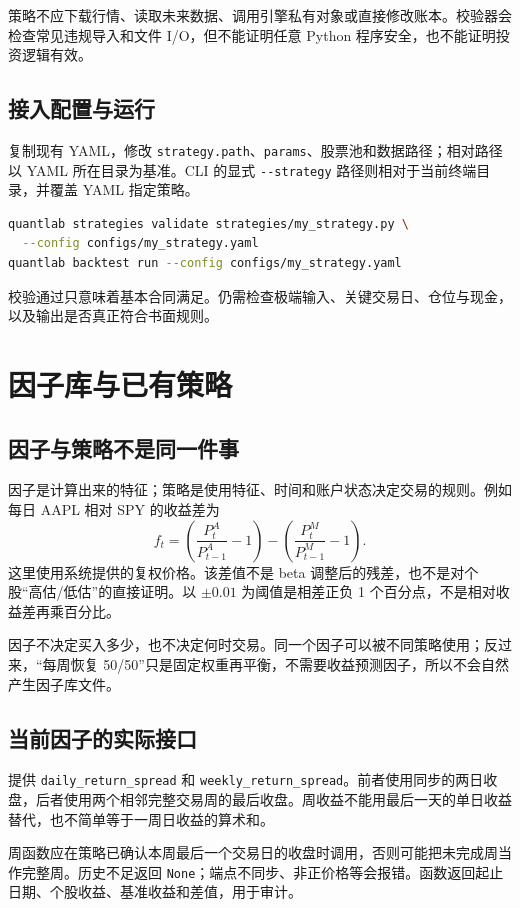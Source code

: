 \documentclass[UTF8,fontset=none,11pt]{ctexart}
\newcommand{\code}[1]{\nolinkurl{#1}}
\let\originalsection\section
\renewcommand{\section}{\Needspace{9\baselineskip}\originalsection}
\let\originalsubsection\subsection
\renewcommand{\subsection}{\Needspace{8\baselineskip}\originalsubsection}
\begin{document}
策略不应下载行情、读取未来数据、调用引擎私有对象或直接修改账本。校验器会检查常见违规导入和文件 I/O，但不能证明任意 Python 程序安全，也不能证明投资逻辑有效。

\subsection{接入配置与运行}
复制现有 YAML，修改 \code{strategy.path}、\code{params}、股票池和数据路径；相对路径以 YAML 所在目录为基准。CLI 的显式 \code{--strategy} 路径则相对于当前终端目录，并覆盖 YAML 指定策略。
\begin{lstlisting}[language=bash]
quantlab strategies validate strategies/my_strategy.py \
  --config configs/my_strategy.yaml
quantlab backtest run --config configs/my_strategy.yaml
\end{lstlisting}
校验通过只意味着基本合同满足。仍需检查极端输入、关键交易日、仓位与现金，以及输出是否真正符合书面规则。

\section{因子库与已有策略}
\subsection{因子与策略不是同一件事}
因子是计算出来的特征；策略是使用特征、时间和账户状态决定交易的规则。例如每日 AAPL 相对 SPY 的收益差为
\[
 f_t=\left(\frac{P^{A}_{t}}{P^{A}_{t-1}}-1\right)
     -\left(\frac{P^{M}_{t}}{P^{M}_{t-1}}-1\right).
\]
这里使用系统提供的复权价格。该差值不是 beta 调整后的残差，也不是对个股“高估/低估”的直接证明。以 \(\pm0.01\) 为阈值是相差正负 1 个百分点，不是相对收益差再乘百分比。

因子不决定买入多少，也不决定何时交易。同一个因子可以被不同策略使用；反过来，“每周恢复 50/50”只是固定权重再平衡，不需要收益预测因子，所以不会自然产生因子库文件。

\subsection{当前因子的实际接口}
 提供 \code{daily_return_spread} 和 \code{weekly_return_spread}。前者使用同步的两日收盘，后者使用两个相邻完整交易周的最后收盘。周收益不能用最后一天的单日收益替代，也不简单等于一周日收益的算术和。

周函数应在策略已确认本周最后一个交易日的收盘时调用，否则可能把未完成周当作完整周。历史不足返回 \code{None}；端点不同步、非正价格等会报错。函数返回起止日期、个股收益、基准收益和差值，用于审计。
\end{document}
